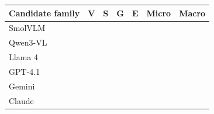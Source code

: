 \begin{tabular}{lrrrrrr}
\toprule
Candidate family & V & S & G & E & Micro & Macro\\\midrule
SmolVLM &  &  &  &  &  & \\
Qwen3-VL &  &  &  &  &  & \\
Llama 4 &  &  &  &  &  & \\
GPT-4.1 &  &  &  &  &  & \\
Gemini &  &  &  &  &  & \\
Claude &  &  &  &  &  & \\
\bottomrule
\end{tabular}
